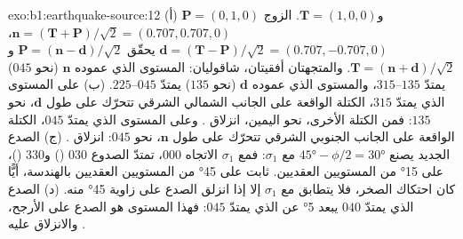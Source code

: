 \begin{solution}{exo:b1:earthquake-source:12}
(أ) $\mathbf P = (0, 1, 0)$ و$\mathbf T = (1, 0, 0)$. الزوج
$\mathbf n = (\mathbf T + \mathbf P)/\sqrt2 = (0.707, 0.707, 0)$،
$\mathbf d = (\mathbf T - \mathbf P)/\sqrt2 = (0.707, -0.707, 0)$ يحقّق
$\mathbf P = (\mathbf n - \mathbf d)/\sqrt2$ و$\mathbf T = (\mathbf n +
\mathbf d)/\sqrt2$. والمتجهتان أفقيتان،  شاقوليان: المستوى الذي عموده $\mathbf n$ (نحو $045$) يمتدّ $135$--$315$، والمستوى الذي عموده $\mathbf d$ (نحو $135$) يمتدّ $045$--$225$. (ب) على المستوى الذي يمتدّ $315$، الكتلة الواقعة على الجانب الشمالي الشرقي تتحرّك على طول $\mathbf d$، نحو $135$: فمن الكتلة الأخرى، نحو اليمين، انزلاق . وعلى المستوى الذي يمتدّ $045$، الكتلة الواقعة على الجانب الجنوبي الشرقي تتحرّك على طول $\mathbf n$، نحو $045$: انزلاق . (ج) الصدع الجديد يصنع $\ang{45} - \phi/2 =
\ang{30}$ مع $\sigma_1$: فمع $\sigma_1$ الاتجاه $000$، تمتدّ الصدوع $030$ () و$330$ ()، على \ang{15} من المستويين العقديين.  ثابت على \ang{45} من المستويين العقديين بالهندسة، أيًّا كان احتكاك الصخر، فلا يتطابق مع $\sigma_1$ إلا إذا انزلق الصدع على زاوية \ang{45} منه. (د) الصدع الذي يمتدّ $040$ يبعد \ang{5} عن  الذي يمتدّ $045$: فهذا المستوى هو الصدع على الأرجح، والانزلاق عليه .
\end{solution}

